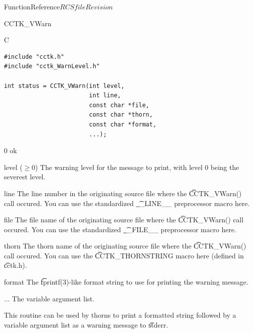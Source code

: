 \begin{cactuspart}{FunctionReference}{$RCSfile$}{$Revision$}
\begin{FunctionDescription}{CCTK\_VWarn}
\begin{SynopsisSection}
\begin{Synopsis}{C}
\begin{verbatim}
#include "cctk.h"
#include "cctk_WarnLevel.h"

int status = CCTK_VWarn(int level,
                        int line,
                        const char *file,
                        const char *thorn,
                        const char *format,
                        ...);
\end{verbatim}
\end{Synopsis}
\end{SynopsisSection}

\begin{ResultSection}
\begin{Result}{0} ok \end{Result}
\end{ResultSection}

\begin{ParameterSection}
\begin{Parameter}{level ($\ge 0$)}
The warning level for the message to print, with level 0 being the severest
level.
\end{Parameter}
\begin{Parameter}{line}
The line number in the originating source file where the {\t CCTK\_VWarn()} call
occured. You can use the standardized {\t \_\_LINE\_\_} preprocessor macro here.
\end{Parameter}
\begin{Parameter}{file}
The file name of the originating source file where the {\t CCTK\_VWarn()} call
occured. You can use the standardized {\t \_\_FILE\_\_} preprocessor macro here.
\end{Parameter}
\begin{Parameter}{thorn}
The thorn name of the originating source file where the {\t CCTK\_VWarn()} call occured. You can use the {\t CCTK\_THORNSTRING} macro here (defined in {\t cctk.h}).
\end{Parameter}
\begin{Parameter}{format}
The {\t fprintf(3)}-like format string to use for printing the warning message.
\end{Parameter}
\begin{Parameter}{...}
The variable argument list.
\end{Parameter}
\end{ParameterSection}

\begin{Discussion}
This routine can be used by thorns to print a formatted string followed by
a variable argument list as a warning message to {\t stderr}.


\end{Discussion}
\end{FunctionDescription}
\end{cactuspart}
